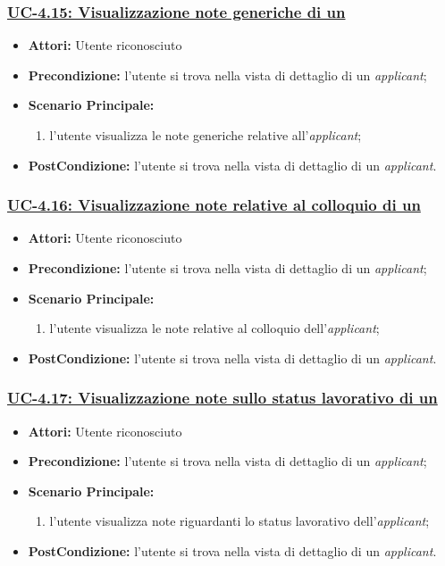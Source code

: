 \subsubsection{\underline{UC-4.15: Visualizzazione note generiche di un \applicant}}
\begin{itemize}
	\item \textbf{Attori:} Utente riconosciuto
	\item \textbf{Precondizione:} l'utente si trova nella vista di dettaglio di un \textit{applicant};
	\item \textbf{Scenario Principale:}
	\begin{enumerate} 
		\item l'utente visualizza le note generiche relative all'\textit{applicant};
	\end{enumerate}
	\item \textbf{PostCondizione:} l'utente si trova nella vista di dettaglio di un \textit{applicant}.
\end{itemize}

\subsubsection{\underline{UC-4.16: Visualizzazione note relative al colloquio di un \applicant}}
\begin{itemize}
	\item \textbf{Attori:} Utente riconosciuto
	\item \textbf{Precondizione:} l'utente si trova nella vista di dettaglio di un \textit{applicant};
	\item \textbf{Scenario Principale:}
	\begin{enumerate} 
		\item l'utente visualizza le note relative al colloquio dell'\textit{applicant};
	\end{enumerate}
	\item \textbf{PostCondizione:} l'utente si trova nella vista di dettaglio di un \textit{applicant}.
\end{itemize}


\subsubsection{\underline{UC-4.17: Visualizzazione note sullo status lavorativo di un \applicant}}
\begin{itemize}
	\item \textbf{Attori:} Utente riconosciuto
	\item \textbf{Precondizione:} l'utente si trova nella vista di dettaglio di un \textit{applicant};
	\item \textbf{Scenario Principale:}
	\begin{enumerate} 
		\item l'utente visualizza note riguardanti lo status lavorativo dell'\textit{applicant};
	\end{enumerate}
	\item \textbf{PostCondizione:} l'utente si trova nella vista di dettaglio di un \textit{applicant}.
\end{itemize}


